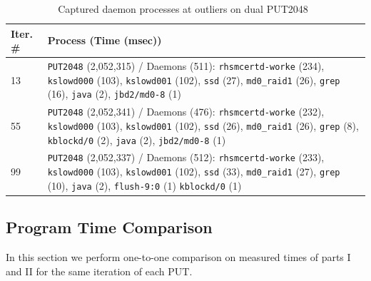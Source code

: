 \documentclass[10pt]{article}
\begin{document}
\begin{table}[htp!]
\centering
{
 \begin{tabular}{|p{2cm}|p{8cm}|} \hline
Iter. \# & Process (Time (msec))\\ \hline
13 & {\tt PUT2048} (2,052,315) / Daemons (511): {\tt rhsmcertd-worke} (234), {\tt kslowd000} (103), {\tt kslowd001} (102),  {\tt ssd} (27), {\tt md0\_raid1} (26), {\tt grep} (16), {\tt java} (2), {\tt jbd2/md0-8} (1)\\ \hline
55 & {\tt PUT2048} (2,052,341) / Daemons (476): {\tt rhsmcertd-worke} (232),  {\tt kslowd000} (103), {\tt kslowd001} (102),  {\tt ssd} (26), {\tt md0\_raid1} (26), {\tt grep} (8), {\tt kblockd/0} (2),  {\tt java} (2), {\tt jbd2/md0-8} (1)\\ \hline
99 & {\tt PUT2048} (2,052,337) / Daemons (512): {\tt rhsmcertd-worke} (233), {\tt kslowd000} (103), {\tt kslowd001} (102),  {\tt ssd} (33), {\tt md0\_raid1} (27), {\tt grep} (10), {\tt java} (2), {\tt flush-9:0} (1) {\tt kblockd/0} (1) \\ \hline
  \end{tabular}
  }
 \caption{Captured daemon processes at outliers on dual PUT2048~\label{fig:no_rhn_dual_put2048_procs}}
\end{table}

\clearpage
\newpage

\subsection{Program Time Comparison}
In this section we perform one-to-one comparison on measured times of parts I and II 
for the same iteration of each PUT.
\end{document}

